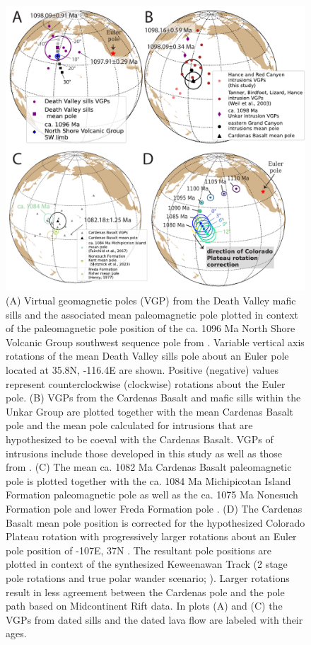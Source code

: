 \documentclass[draft]{agujournal2019}
\begin{document}
\begin{figure}[h!]
\centering
\includegraphics[width=\textwidth]{poles.pdf}
\caption{\footnotesize (A) Virtual geomagnetic poles (VGP) from the Death Valley mafic sills and the associated mean paleomagnetic pole plotted in context of the paleomagnetic pole position of the ca. 1096 Ma North Shore Volcanic Group southwest sequence pole from . Variable vertical axis rotations of the mean Death Valley sills pole about an Euler pole located at 35.8\textdegree N, -116.4\textdegree E are shown. Positive (negative) values represent counterclockwise (clockwise) rotations about the Euler pole. (B) VGPs from the Cardenas Basalt and mafic sills within the Unkar Group are plotted together with the mean Cardenas Basalt pole and the mean pole calculated for intrusions that are hypothesized to be coeval with the Cardenas Basalt. VGPs of intrusions include those developed in this study as well as those from . (C) The mean ca. 1082 Ma Cardenas Basalt paleomagnetic pole is plotted together with the ca. 1084 Ma Michipicotan Island Formation paleomagnetic pole \cite{Fairchild2017a} as well as the ca. 1075 Ma Nonesuch Formation pole \cite{Slotznick2023a} and lower Freda Formation pole \cite{Henry1977a}. (D) The Cardenas Basalt mean pole position is corrected for the hypothesized Colorado Plateau rotation with progressively larger rotations about an Euler pole position of -107\textdegree E, 37\textdegree N \cite{Bryan1990a}. The resultant pole positions are plotted in context of the synthesized Keweenawan Track (2 stage pole rotations and true polar wander scenario; ). Larger rotations result in less agreement between the Cardenas pole and the pole path based on Midcontinent Rift data. In plots (A) and (C) the VGPs from dated sills and the dated lava flow are labeled with their ages.}
\label{fig:poles}
\end{figure}
\end{document}
